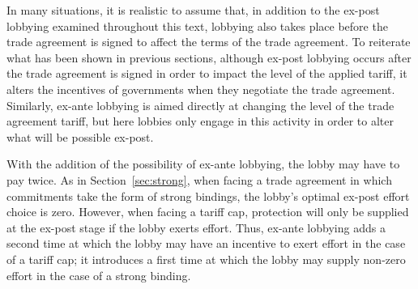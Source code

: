 

%
%




%

In many situations, it is realistic to assume that, in addition to the ex-post lobbying examined throughout this text, lobbying also takes place before the trade agreement is signed to affect the terms of the trade agreement. To reiterate what has been shown in previous sections, although ex-post lobbying occurs after the trade agreement is signed in order to impact the level of the applied tariff, it alters the incentives of governments when they negotiate the trade agreement. Similarly, ex-ante lobbying is aimed directly at changing the level of the trade agreement tariff, but here lobbies only engage in this activity in order to alter what will be possible ex-post.

With the addition of the possibility of ex-ante lobbying, the lobby may have to pay twice. As in Section~\ref{sec:strong}, when facing a trade agreement in which commitments take the form of strong bindings, the lobby's optimal ex-post effort choice is zero. However, when facing a tariff cap, protection will only be supplied at the ex-post stage if the lobby exerts effort. Thus, ex-ante lobbying adds a second time at which the lobby may have an incentive to exert effort in the case of a tariff cap; it introduces a first time at which the lobby may supply non-zero effort in the case of a strong binding.



